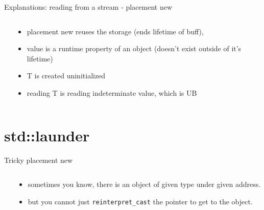 \documentclass{panicsoftware-presentation}
\makeatletter
\newenvironment{itemizeSeq}{\begin{itemize}[<+-|alert@+>]}{\end{itemize}}
\makeatother
\begin{document}
\begin{frame}{Explanations: reading from a stream - placement new}

\begin{columns}

\begin{column}{0.48\linewidth}

\inputminted{\myCpp}{examples/invalid-reinterpret-cast-2-short.cpp}
\end{column}

\begin{column}{0.48\linewidth}

\begin{itemizeSeq}
\item placement new reuses the storage (ends lifetime of buff),
\item value is a runtime property of an object (doesn't exist outside of it's lifetime)
\item T is created uninitialized
\item reading T is reading indeterminate value, which is UB
\end{itemizeSeq}
\end{column}
\end{columns}
\end{frame}

\section*{std::launder}

\begin{frame}{Tricky placement new}

\begin{columns}

\begin{column}{0.48\linewidth}
\inputminted{\myCpp}{examples/placement-new-issue.cpp}
\end{column}

\begin{column}{0.48\linewidth}
\begin{itemizeSeq}
\item sometimes you know, there is an object of given type under given address.
\item but you cannot just \texttt{reinterpret\_cast} the pointer to get to the object.
\end{itemizeSeq}
\end{column}
\end{columns}
\end{frame}
\end{document}
